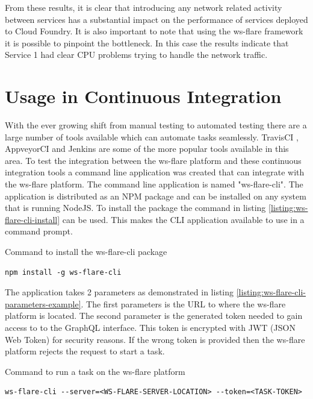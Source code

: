 From these results, it is clear that introducing any network related activity between services has a substantial impact on the performance of services deployed to Cloud Foundry. It is also important to note that using the ws-flare framework it is possible to pinpoint the bottleneck. In this case the results indicate that Service 1 had clear CPU problems trying to handle the network traffic.

\section{Usage in Continuous Integration}

With the ever growing shift from manual testing to automated testing there are a large number of tools available which can automate tasks seamlessly. TravisCI \cite{travisCI}, AppveyorCI \cite{appveyorCI} and Jenkins \cite{jenkinsCi} are some of the more popular tools available in this area. To test the integration between the ws-flare platform and these continuous integration tools a command line application was created that can integrate with the ws-flare platform. The command line application is named "ws-flare-cli". The application is distributed as an NPM package and can be installed on any system that is running NodeJS. To install the package the command in listing \ref{listing:ws-flare-cli-install} can be used. This makes the CLI application available to use in a command prompt.

\begin{listing}[H]
    \caption{Command to install the ws-flare-cli package}
    \label{listing:ws-flare-cli-install}
    \begin{verbatim}
npm install -g ws-flare-cli
\end{verbatim}
\end{listing}

The application takes 2 parameters as demonstrated in listing \ref{listing:ws-flare-cli-parameters-example}. The first parameters is the URL to where the ws-flare platform is located. The second parameter is the generated token needed to gain access to to the GraphQL interface. This token is encrypted with JWT (JSON Web Token) for security reasons. If the wrong token is provided then the ws-flare platform rejects the request to start a task.

\begin{listing}[H]
    \caption{Command to run a task on the ws-flare platform}
    \label{listing:ws-flare-cli-parameters-example}
    \begin{verbatim}
ws-flare-cli --server=<WS-FLARE-SERVER-LOCATION> --token=<TASK-TOKEN>
\end{verbatim}
\end{listing}

